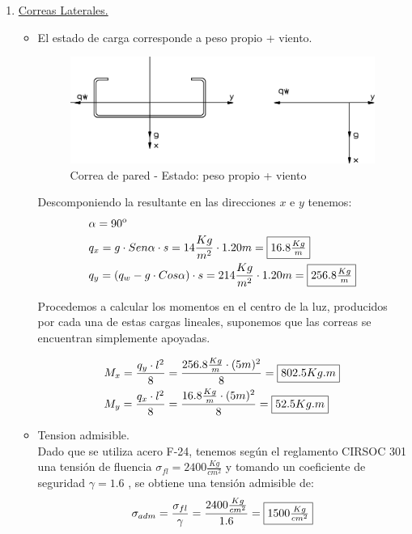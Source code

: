 \begin{enumerate}
\newpage
\item \underline{Correas Laterales.}\\
\begin{itemize}

\item El estado de carga corresponde a peso propio + viento.

\begin{figure}[H]
\begin{center}
     \includegraphics[scale = 1]{chapters/chapter_3/images/figura5.png}
\caption{Correa de pared - Estado: peso propio + viento}
\end{center}
\end{figure}

Descomponiendo la resultante en las direcciones $x$ e $y$ tenemos:
\begin{align*}
& \alpha = 90 \textsuperscript{o}\\
& q_x=g \cdot Sen \alpha \cdot s = 14 \frac{Kg}{m^2} \cdot 1.20m= \framebox{$16.8 \frac{Kg}{m}$}\\
& q_y=(q_w - g \cdot Cos \alpha) \cdot s = 214 \frac{Kg}{m^2} \cdot 1.20m= \framebox{$256.8 \frac{Kg}{m}$}
\end{align*}

Procedemos a calcular los momentos en el centro de la luz, producidos por cada una de estas cargas lineales, suponemos que las correas se encuentran simplemente apoyadas.

\begin{align*}
& M_x= \frac{q_y \cdot l^2}{8} = \frac{256.8 \frac{Kg}{m} \cdot (5m)^2}{8} = \framebox{$802.5 Kg.m$} \\
& M_y= \frac{q_x \cdot l^2}{8} = \frac{16.8 \frac{Kg}{m} \cdot (5m)^2}{8} = \framebox{$52.5 Kg.m$}
\end{align*}

\item Tension admisible.\\
Dado que se utiliza acero F-24, tenemos según el reglamento CIRSOC 301 una tensión de fluencia $\sigma_{fl}=2400 \frac{Kg}{cm^2}$ y tomando un coeficiente de seguridad $\gamma = 1.6$ , se obtiene una tensión admisible de:
$$\sigma_{adm}= \frac{\sigma_{fl}}{\gamma} = \frac{2400 \frac{Kg}{cm^2}}{1.6} = \framebox{$1500 \frac{Kg}{cm^2}$}$$


\end{itemize}
\end{enumerate}

